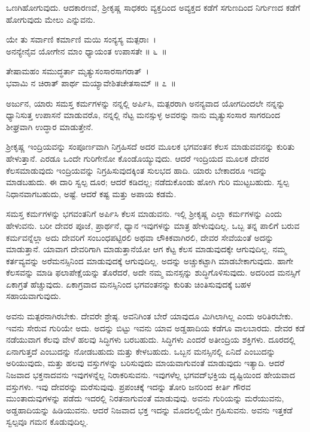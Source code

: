 ಒಣಗಿಹೋಗುವುದು. ಆದಕಾರಣವೆ, ಶ‍್ರೀಕೃಷ್ಣ ಸಾಧಕರು ವ್ಯಕ್ತದಿಂದ ಅವ್ಯಕ್ತದ ಕಡೆಗೆ ಸಗುಣದಿಂದ ನಿರ್ಗುಣದ ಕಡೆಗೆ ಹೋಗುವುದು ಮೇಲು ಎನ್ನುವನು.

\begin{shloka}
ಯೇ ತು ಸರ್ವಾಣಿ ಕರ್ಮಾಣಿ ಮಯಿ ಸಂನ್ಯಸ್ಯ ಮತ್ಪರಾಃ~।\\ಅನನ್ಯೇನೈವ ಯೋಗೇನ ಮಾಂ ಧ್ಯಾಯಂತ ಉಪಾಸತೇ \hfill॥ ೬~॥
\end{shloka}

\begin{shloka}
ತೇಷಾಮಹಂ ಸಮುದ್ಧರ್ತಾ ಮೃತ್ಯುಸಂಸಾರಸಾಗರಾತ್~।\\ಭವಾಮಿ ನ ಚಿರಾತ್ ಪಾರ್ಥ ಮಯ್ಯಾವೇಶಿತಚೇತಸಾಮ್ \hfill॥ ೭~॥
\end{shloka}

\newpage

\begin{artha}
ಅರ್ಜುನ, ಯಾರು ಸಮಸ್ತ ಕರ್ಮಗಳನ್ನು ನನ್ನಲ್ಲಿ ಅರ್ಪಿಸಿ, ಮತ್ಪರರಾಗಿ ಅನನ್ಯವಾದ ಯೋಗ\-ದಿಂದಲೇ ನನ್ನನ್ನು ಧ್ಯಾನಿಸುತ್ತ ಉಪಾಸನೆ ಮಾಡುವರೊ, ನನ್ನಲ್ಲಿ ನೆಟ್ಟ ಮನಸ್ಸುಳ್ಳ ಅವರನ್ನು ನಾನು ಮೃತ್ಯುಸಂಸಾರ ಸಾಗರದಿಂದ ಶೀಘ್ರವಾಗಿ ಉದ್ಧಾರ ಮಾಡುತ್ತೇನೆ.
\end{artha}

ಶ‍್ರೀಕೃಷ್ಣ ಇಂದ್ರಿಯವನ್ನು ಸಂಪೂರ್ಣವಾಗಿ ನಿಗ್ರಹಿಸದೆ ಅದರ ಮೂಲಕ ಭಗವಂತನ ಕೆಲಸ ಮಾಡುವವನನ್ನು ಕುರಿತು ಹೇಳುತ್ತಾನೆ. ಎರಡೂ ಒಂದೇ ಗುರಿಗೇನೋ ಕೊಂಡೊಯ್ಯುವುದು. ಆದರೆ ಇಂದ್ರಿಯದ ಮೂಲಕ ದೇವರ ಕೆಲಸಮಾಡುವುದು ಇಂದ್ರಿಯವನ್ನು ನಿಗ್ರಹಿಸುವುದಕ್ಕಿಂತ ಸುಲಭದ ಹಾದಿ. ಯಾರು ಬೇಕಾದರೂ ಇದನ್ನು ಮಾಡಬಹುದು. ಈ ದಾರಿ ಸ್ವಲ್ಪ ದೂರ; ಆದರೆ ಕಡಿದಲ್ಲ; ನಡೆದುಕೊಂಡು ಹೋಗಿ ಗುರಿ ಮುಟ್ಟಬಹುದು. ಸ್ವಲ್ಪ ನಿಧಾನವಾಗಬಹುದು, ಅಷ್ಟೆ. ಆದರೆ ಕಷ್ಟ ಮತ್ತು ಅಪಾಯ ಕಡಮೆ.

ಸಮಸ್ತ ಕರ್ಮಗಳನ್ನು ಭಗವಂತನಿಗೆ ಅರ್ಪಿಸಿ ಕೆಲಸ ಮಾಡುವನು. ಇಲ್ಲಿ ಶ‍್ರೀಕೃಷ್ಣ ಎಲ್ಲಾ ಕರ್ಮಗಳನ್ನು ಎಂದು ಹೇಳುವನು. ಬರೀ ದೇವರ ಪೂಜೆ, ಪ್ರಾರ್ಥನೆ, ಧ್ಯಾನ ಇವುಗಳನ್ನು ಮಾತ್ರ ಹೇಳುವುದಿಲ್ಲ. ಒಬ್ಬ ತನ್ನ ಪಾಲಿಗೆ ಬರುವ ಕರ್ಮವನ್ನೆಲ್ಲಾ ಅದು ದೇವರಿಗೆ ಸಂಬಂಧಪಟ್ಟಿರಲಿ ಅಥವಾ ಲೌಕಿಕವಾಗಿರಲಿ, ದೇವರ ಸೇವೆಯಂತೆ ಅದನ್ನು ಮಾಡುತ್ತಾನೆ. ಯಾವಾಗ ದೇವರಿಗಾಗಿ ಮಾಡುತ್ತಾನೆಯೋ ಆಗ ಕೆಟ್ಟ ಕೆಲಸ ಮಾಡುವುದಕ್ಕೇ ಆಗುವುದಿಲ್ಲ. ನಮ್ಮ ಕರ್ತವ್ಯವನ್ನು ಅರೆಮನಸ್ಸಿನಿಂದ ಮಾಡುವುದಕ್ಕೆ ಆಗುವುದಿಲ್ಲ. ಅದನ್ನು ಅಚ್ಚುಕಟ್ಟಾಗಿ ಮಾಡಬೇಕಾಗುವುದು. ಹಾಗೇ ಕೆಲಸವನ್ನು ಮಾಡಿ ಫಲಾಪೇಕ್ಷೆಯನ್ನು ತೊರೆದರೆ, ಅದೇ ನಮ್ಮ ಮನಸ್ಸನ್ನು ಶುದ್ಧಿಗೊಳಿಸುವುದು. ಅದರಿಂದ ಮನಸ್ಸಿಗೆ ಏಕಾಗ್ರತೆ ಹೆಚ್ಚುವುದು. ಏಕಾಗ್ರವಾದ ಮನಸ್ಸಿನಿಂದ ಭಗವಂತನನ್ನು ಕುರಿತು ಚಿಂತಿಸುವುದಕ್ಕೆ ಬಹಳ ಸಹಾಯವಾಗುವುದು.

ಅವನು ಮತ್ಪರನಾಗಿರಬೇಕು. ದೇವರೇ ಶ್ರೇಷ್ಠ. ಅವನಿಗಿಂತ ಬೇರೆ ಯಾವುದೂ ಮಿಗಿಲಾಗಿಲ್ಲ ಎಂದು ಅರಿತಿರಬೇಕು. ಇವನು ಸೇರುವ ಗುರಿಯೇ ಅದು. ಅದನ್ನು ಬಿಟ್ಟು ಇವನು ಯಾವ ಅಡ್ಡಹಾದಿಯ ಕಡೆಗೂ ವಾಲಬಾರದು. ದೇವರ ಕಡೆ ನಡೆಯುವಾಗ ಕೆಲವು ವೇಳೆ ಹಲವು ಸಿದ್ಧಿಗಳು ಬರಬಹುದು. ಸಿದ್ಧಿಗಳು ಎಂದರೆ ಅತೀಂದ್ರಿಯ ಶಕ್ತಿಗಳು. ದೂರದಲ್ಲಿ ಏನಾಗುತ್ತದೆ ಎಂಬುದನ್ನು ನೋಡಬಹುದು ಮತ್ತು ಕೇಳಬಹುದು. ಒಬ್ಬನ ಮನಸ್ಸಿನಲ್ಲಿ ಏನಿದೆ ಎಂಬುದನ್ನು ಅರಿಯುವುದು, ಮತ್ತು ಹಲವು ವಸ್ತುಗಳನ್ನು ಬರಿಸುವುದು ಮಾಯವಾಗುವಂತೆ ಮಾಡುವುದು ಇತ್ಯಾದಿ. ಆದರೆ ನಿಜವಾದ ಭಕ್ತನಾದವನು ಇವುಗಳನ್ನೆಲ್ಲ ನಿರಾಕರಿಸುವನು. ಇವುಗಳೆಲ್ಲ ಭಗವದ್​ಭಕ್ತಿಯ ದೃಷ್ಟಿಯಿಂದ ಹೇಯವಾದ ವಸ್ತುಗಳು. ಇವು ದೇವರನ್ನು ಮರೆಸುವುವು. ಪ್ರಪಂಚಕ್ಕೆ ಇದನ್ನು ತೋರಿ ಜನರಿಂದ ಕೀರ್ತಿ ಗೌರವ ಮುಂತಾದುವುಗಳನ್ನು ಪಡೆದು ಇದರಲ್ಲಿ ನಿರತನಾಗುವಂತೆ ಮಾಡುವುವು. ಅವನು ಗುರಿಯನ್ನು ಮರೆಯುವನು, ಅಡ್ಡಹಾದಿಯನ್ನು ಹಿಡಿಯುವನು. ಆದರೆ ನಿಜವಾದ ಭಕ್ತ ಇದನ್ನು ಮೊದಲಲ್ಲಿಯೇ ಗ್ರಹಿಸುವನು. ಅವನು ಇತ್ತಕಡೆ ಸ್ವಲ್ಪವೂ ಗಮನ ಕೊಡುವುದಿಲ್ಲ.


